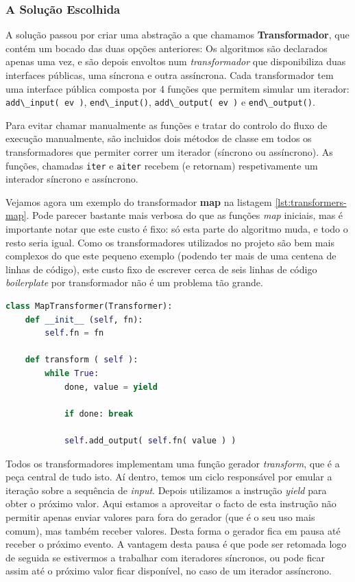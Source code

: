 \subsubsection{A Solução Escolhida}
A solução passou por criar uma abstração a que chamamos \textbf{Transformador}, que contém um bocado das duas opções anteriores: Os algoritmos são declarados apenas uma vez, e são depois envoltos num \textit{transformador} que disponibiliza duas interfaces públicas, uma síncrona e outra assíncrona. Cada transformador tem uma interface pública composta por 4 funções que permitem simular um iterador: \verb|add\_input( ev )|, \verb|end\_input()|, \verb|add\_output( ev )| e \verb|end\_output()|.

Para evitar chamar manualmente as funções e tratar do controlo do fluxo de execução manualmente, são incluidos dois métodos de classe em todos os transformadores que permiter correr um iterador (síncrono ou assíncrono). As funções, chamadas \texttt{iter} e \texttt{aiter} recebem (e retornam) respetivamente um interador síncrono e assíncrono.

Vejamos agora um exemplo do transformador \textbf{map} na listagem \ref{lst:transformers-map}. Pode parecer bastante mais verbosa do que as funções \textit{map} iniciais, mas é importante notar que este custo é fixo: só esta parte do algoritmo muda, e todo o resto seria igual. Como os transformadores utilizados no projeto são bem mais complexos do que este pequeno exemplo (podendo ter mais de uma centena de linhas de código), este custo fixo de escrever cerca de seis linhas de código \textit{boilerplate} por transformador não é um problema tão grande.

\begin{lstlisting}[caption={Exemplo de um transformador \texttt{map} e da sua utilização},label={lst:transformers-map},language=Python]
class MapTransformer(Transformer):
    def __init__ (self, fn):
        self.fn = fn
    
    def transform ( self ):
        while True:
            done, value = yield

            if done: break
            
            self.add_output( self.fn( value ) )
\end{lstlisting}

Todos os transformadores implementam uma função gerador \textit{transform}, que é a peça central de tudo isto. Aí dentro, temos um ciclo responsável por emular a iteração sobre a sequência de \textit{input}. Depois utilizamos a instrução \textit{yield} para obter o próximo valor. Aqui estamos a aproveitar o facto de esta instrução não permitir apenas enviar valores para fora do gerador (que é o seu uso mais comum), mas também receber valores. Desta forma o gerador fica em pausa até receber o próximo evento. A vantagem desta pausa é que pode ser retomada logo de seguida se estivermos a trabalhar com iteradores síncronos, ou pode ficar assim até o próximo valor ficar disponível, no caso de um iterador assíncrono.

